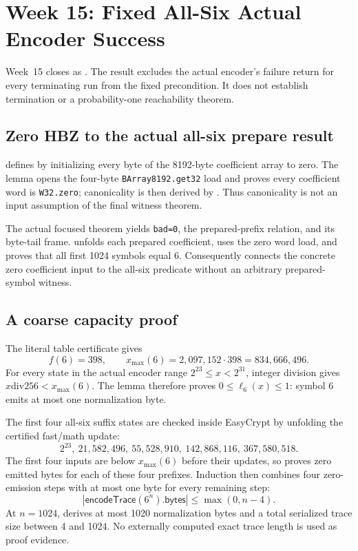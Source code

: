 \section{Week 15: Fixed All-Six Actual Encoder Success}

Week~15 closes  as
.  The
result excludes the actual encoder's failure return for every terminating run
from the fixed precondition.  It does not establish termination or a
probability-one reachability theorem.

\subsection*{Zero HBZ to the actual all-six prepare result}

 defines  by initializing
every byte of the 8192-byte coefficient array to zero.  The lemma
 opens the four-byte \texttt{BArray8192.get32} load
and proves every coefficient word is \texttt{W32.zero}; canonicality is then
derived by .  Thus canonicality is not an input
assumption of the final witness theorem.

The actual focused  theorem yields
\texttt{bad=0}, the prepared-prefix relation, and its byte-tail frame.
 unfolds each prepared coefficient,
uses the zero word load, and proves that all first 1024 symbols equal 6.
Consequently  connects
the concrete zero coefficient input to the all-six predicate without an
arbitrary prepared-symbol witness.

\subsection*{A coarse capacity proof}

The literal table certificate gives
\[
 f(6)=398,
 \qquad x_{\max}(6)=2{,}097{,}152\cdot398=834{,}666{,}496.
\]
For every state in the actual encoder range
$2^{23}\leq x<2^{31}$, integer division gives
$x\mathbin{\mathrm{div}}256<x_{\max}(6)$.  The lemma
 therefore proves
$0\leq\ell_6(x)\leq1$: symbol 6 emits at most one normalization byte.

The first four all-six suffix states are checked inside EasyCrypt by unfolding
the certified fast/math update:
\[
 2^{23},\ 21{,}582{,}496,\ 55{,}528{,}910,\
 142{,}868{,}116,\ 367{,}580{,}518.
\]
The first four inputs are below $x_{\max}(6)$ before their updates, so
\procname{all_six_first_four_no_normalization} proves zero emitted bytes for
each of these four prefixes.  Induction then combines four zero-emission
steps with at most one byte for every remaining step:
\[
 \left|\mathsf{encodeTrace}(6^n).\mathsf{bytes}\right|
 \leq \max(0,n-4).
\]
At $n=1024$,  derives at most 1020
normalization bytes and a total serialized trace size between 4 and 1024.
No externally computed exact trace length is used as proof evidence.

